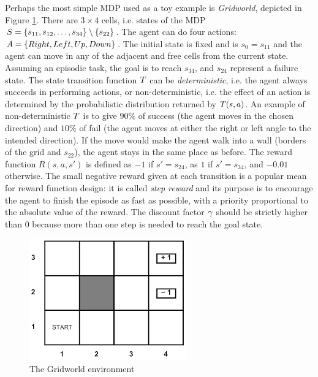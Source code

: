 \begin{example}\label{exa:gridworld} Perhaps the most simple MDP used as a toy example is \emph{Gridworld}, depicted in Figure \ref{fig:gridworld}.
There are $3\times 4$ cells, i.e. states of the MDP $S = \{s_{11}, s_{12}, \dots, s_{34}\}\setminus \{s_{22}\}$. The agent can do four actions: $A = \{Right, Left, Up, Down\}$. The initial state is fixed and is $s_0 = s_{11}$ and the agent can move in any of the adjacent and free cells from the current state. Assuming an episodic task, the goal is to reach $s_{34}$, and $s_{24}$ represent a failure state. The state transition function $T$ can be \emph{deterministic}, i.e. the agent always succeeds in performing actions, or non-deterministic, i.e. the effect of an action is determined by the probabilistic distribution returned by $T(s, a)$. An example of non-deterministic $T$ is to give $90\%$ of success (the agent moves in the chosen direction) and $10\%$ of fail (the agent moves at either the right or left angle to the intended direction). If the move would make the agent walk into a wall (borders of the grid and $s_{22}$), the agent stays in the same place as before. The reward function $R(s,a,s')$ is defined as $-1$ if $s'=s_{24}$, as $1$ if $s'=s_{34}$, and $-0.01$ otherwise. The small negative reward given at each transition is a popular mean for reward function design: it is called \emph{step reward} and its purpose is to encourage the agent to finish the episode as fast as possible, with a priority proportional to the absolute value of the reward. The discount factor $\gamma$ should be strictly higher than 0 because more than one step is needed to reach the goal state.
	
\begin{figure}[h]
	\centering
	\caption{The Gridworld environment}\label{fig:gridworld}
	\includegraphics[width=.4\linewidth]{images/gridworld}
\end{figure}


\end{example}

